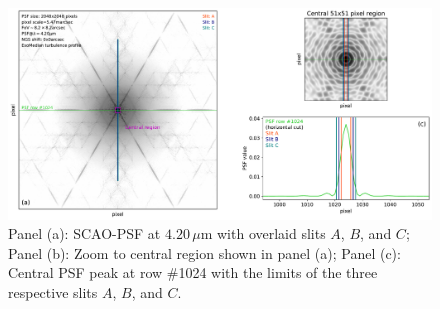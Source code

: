 \begin{landscape}
\begin{figure}[ht!]
  \centering
  \includegraphics[width=1.0\linewidth]{figures/LSS_CrtAlg_files/SCAOPSF_L-band_4.20mum_slits_ABC_0x0_shift.pdf}
  \caption{Panel (a): \ac{SCAO}-\ac{PSF} at $4.20\,\mu$m with overlaid slits $A$, $B$, and $C$; Panel (b): Zoom to central region shown in panel (a); Panel (c): Central \ac{PSF} peak at row \#1024 with the limits of the three respective slits $A$, $B$, and $C$.}
  \label{fig:scaopsfslits}
\end{figure}
\end{landscape}

